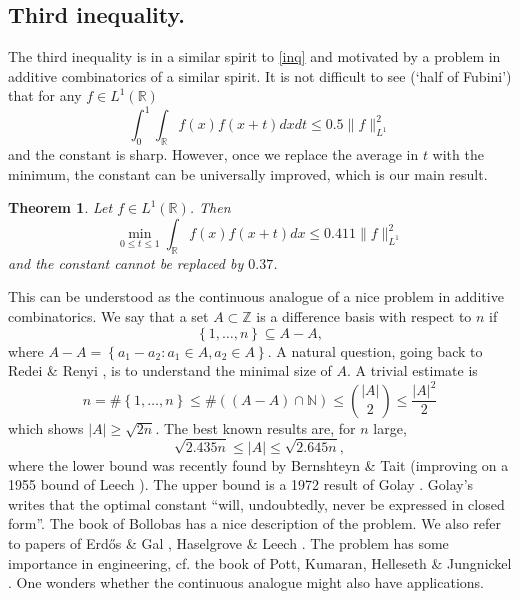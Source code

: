\documentclass{amsart}
\newtheorem{theorem}{Theorem}
\theoremstyle{remark}
\begin{document}
\subsection{Third inequality.} The third inequality is in a similar spirit to \eqref{inq} and motivated by a problem in additive combinatorics of a similar spirit.
It is not difficult to see (`half of Fubini') that for any $f \in L^1(\mathbb{R})$
$$ \int_{0}^{1}{\int_{\mathbb{R}} f(x) f(x+t) dx dt} \leq 0.5 \|f\|_{L^1}^2$$
and the constant is sharp.
However, once we replace the average in $t$ with the minimum, the constant can be universally improved, which is our main result.

\begin{theorem}  Let $f \in L^1(\mathbb{R})$. Then 
$$ \min_{0 \leq t \leq 1}{\int_{\mathbb{R}} f(x) f(x+t) dx} \leq  0.411\|f\|_{L^1}^2$$
and the constant cannot be replaced by $0.37$. 
\end{theorem}
This can be understood as the continuous analogue of a nice problem in additive combinatorics.
 We say that a set $A \subset \mathbb{Z}$ is a difference basis with respect to $n$ if
$$ \left\{1, \dots, n\right\} \subseteq A - A,$$
where $A - A = \left\{a_1 - a_2: a_1 \in A, a_2 \in A\right\}$. A natural question, going back to Redei \& Renyi \cite{red}, is to understand the minimal size of $A$. A trivial estimate is
$$ n = \# \left\{1, \dots, n\right\}  \leq \#((A-A) \cap \mathbb{N} ) \leq \binom{|A|}{2} \leq \frac{|A|^2}{2}$$
which shows $|A| \geq \sqrt{2 n}$. The best known results are, for $n$ large,
$$ \sqrt{2.435 n} \leq |A| \leq \sqrt{2.645n},$$
where the lower bound was recently found by Bernshteyn \& Tait \cite{bern} (improving on a 1955 bound of Leech \cite{leech}). The upper bound is a 1972 result of Golay \cite{golay}.
Golay's writes that the optimal constant ``will, undoubtedly, never be expressed in closed form''. The book of Bollobas \cite{boll} has a nice description of the problem. We also refer to
papers of Erd\H{o}s \& Gal \cite{erdos}, Haselgrove \& Leech \cite{haselgrove}. The problem has some importance in engineering, cf. the book of Pott, Kumaran, Helleseth \& Jungnickel \cite{book}.
One wonders whether the continuous analogue might also have applications.\\
\end{document}
